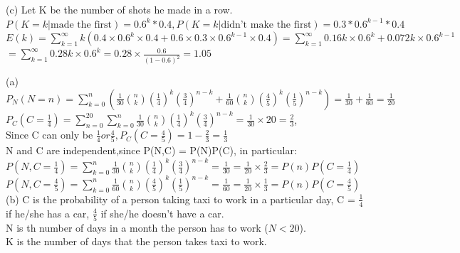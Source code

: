 \documentclass[11pt]{article}
\newcommand{\N}{\mathbb{N}}
\newenvironment{problem}[2][Problem]{\begin{trivlist}
\item[\hskip \labelsep {\bfseries #1}\hskip \labelsep {\bfseries #2.}]}{\end{trivlist}}
\begin{document}
(c) Let K be the number of shots he made in a row. \\
$P(K = k| \text{made the first}) = 0.6^{k} *0.4, P(K = k| \text{didn't make the first}) = 0.3*0.6^{k-1} *0.4$ \\
$E(k) = \sum_{k = 1}^{\infty} k(0.4\times 0.6^{k} \times 0.4 + 0.6 \times 0.3\times 0.6^{k-1} \times 0.4)  = \sum_{k = 1}^{\infty} 0.16k\times 0.6^k + 0.072k\times 0.6^{k-1}$\\
$ = \sum_{k = 1}^{\infty} 0.28k \times 0.6^{k} = 0.28 \times \frac{0.6}{(1 - 0.6)^2} = 1.05$\\

\pagebreak

\begin{problem}{2}
\end{problem}
(a) $P_N(N = n) = \sum_{k =0}^{n} (\frac{1}{30} {n \choose k } (\frac{1}{4})^k (\frac{3}{4})^{n-k} +\frac{1}{60} {n \choose k } (\frac{4}{5})^k (\frac{1}{5})^{n-k} ) =  \frac{1}{30} + \frac{1}{60} = \frac{1}{20}$\\
 $P_C(C = \frac{1}{4}) = \sum_{n = 0}^{20}\sum_{k =0}^{n} \frac{1}{30} {n \choose k } (\frac{1}{4})^k (\frac{3}{4})^{n-k} = \frac{1}{30} \times 20 = \frac{2}{3}$,\\ Since C can only be $\frac{1}{4} or \frac{4}{5}, P_C(C = \frac{4}{5}) = 1 - \frac{2}{3} =\frac{1}{3} $\\
 N and C are independent,since P(N,C) = P(N)P(C), in particular:\\
 $P(N,C = \frac{1}{4}) =  \sum_{k =0}^{n} \frac{1}{30} {n \choose k } (\frac{1}{4})^k (\frac{3}{4})^{n-k} = \frac{1}{30} = \frac{1}{20} \times \frac{2}{3} = P(n)P(C = \frac{1}{4})$\\
  $P(N,C = \frac{4}{5}) = \sum_{k =0}^{n} \frac{1}{60} {n \choose k } (\frac{4}{5})^k (\frac{1}{5})^{n-k} = \frac{1}{60} = \frac{1}{20} \times \frac{1}{3} = P(n)P(C = \frac{4}{5})$\\
 
 (b) C is the probability of a person taking taxi to work in a particular day, C = $\frac{1}{4}$ if he/she has a car, $\frac{4}{5}$ if she/he doesn't have a car. \\N is th number of days in a month the person has to work ($N < 20$).\\ K is the number of days that the person takes taxi to work.\\
 
\end{document}
